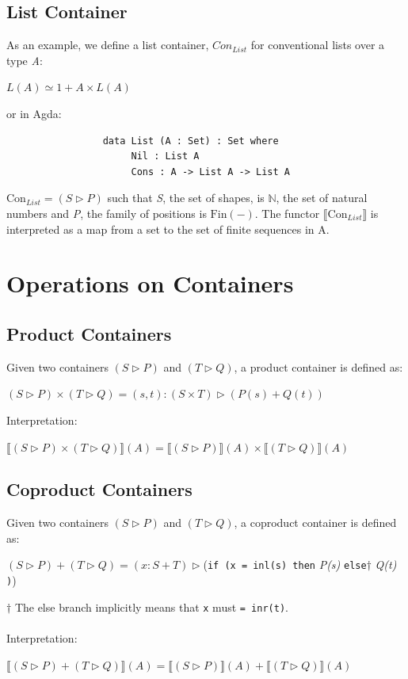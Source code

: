 \documentclass[12pt]{report}
\begin{document}
\subsection*{List Container}
As an example, we define a list container, $Con_{List}$ for conventional lists over a type \textit{A}:
\begin{center}
$ L(A) \simeq 1 + A \times L(A) $
\end{center}
or in Agda:
\begin{verbatim}
                 data List (A : Set) : Set where
                      Nil : List A
                      Cons : A -> List A -> List A
\end{verbatim}
 $\text{Con}_{List} = (S \rhd P) $ such that \textit{S}, the set of shapes, is $\mathbb{N}$, the set of natural numbers and \textit{P}, the family of positions is $\text{Fin}(-)$. The functor $\llbracket \text{Con}_{List} \rrbracket$ is interpreted as a map from a set to the set of finite sequences in A.

\section{Operations on Containers}
\subsection*{Product Containers}
Given two containers $(S \rhd P)$ and $ (T \rhd Q)$, a product container is defined as:
\begin{center}
$(S \rhd P) \times (T \rhd Q) = (s,t): (S \times T) \rhd (P(s) + Q(t))$
\end{center}
Interpretation:
\begin{center}
$\llbracket (S \rhd P) \times (T \rhd Q) \rrbracket (A)= \llbracket(S \rhd P) \rrbracket (A) \times \llbracket (T \rhd Q) \rrbracket (A)$
\end{center}

\subsection*{Coproduct Containers}
Given two containers $(S \rhd P)$ and $ (T \rhd Q)$, a coproduct container is defined as:
\begin{center}
$(S \rhd P) + (T \rhd Q) = (x:S + T) \rhd $(\texttt{if (x = inl(s) then} \textit{P(s)} \texttt{else}$\dagger$ \textit{Q(t)} \texttt{)})
\end{center}
$\dagger$ The else branch implicitly means that \texttt{x} must \texttt{= inr(t)}.\\
\\
Interpretation:
\begin{center}
$\llbracket (S \rhd P) + (T \rhd Q) \rrbracket (A)= \llbracket(S \rhd P) \rrbracket (A) + \llbracket (T \rhd Q) \rrbracket (A)$
\end{center}
\end{document}
